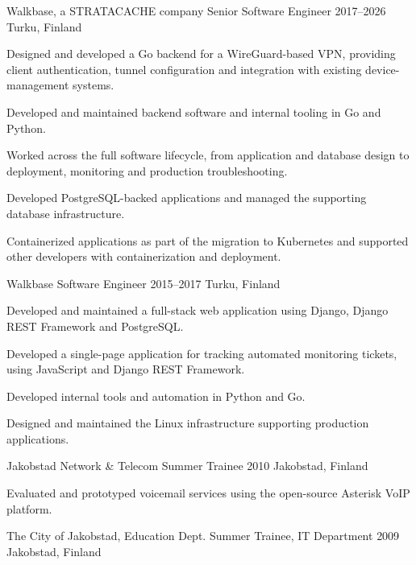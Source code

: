 \cventry
    {Walkbase, a STRATACACHE company}
    {Senior Software Engineer}
    {2017--2026}
    {Turku, Finland}

\begin{cvitems}
    \item Designed and developed a Go backend for a WireGuard-based VPN, providing client authentication, tunnel configuration and integration with existing device-management systems.
    \item Developed and maintained backend software and internal tooling in Go and Python.
    \item Worked across the full software lifecycle, from application and database design to deployment, monitoring and production troubleshooting.
    \item Developed PostgreSQL-backed applications and managed the supporting database infrastructure.
    \item Containerized applications as part of the migration to Kubernetes and supported other developers with containerization and deployment.
\end{cvitems}

\vspace{0.5em}

\cventry
    {Walkbase}
    {Software Engineer}
    {2015--2017}
    {Turku, Finland}

\begin{cvitems}
    \item Developed and maintained a full-stack web application using Django, Django REST Framework and PostgreSQL.
    \item Developed a single-page application for tracking automated monitoring tickets, using JavaScript and Django REST Framework.
    \item Developed internal tools and automation in Python and Go.
    \item Designed and maintained the Linux infrastructure supporting production applications.
\end{cvitems}

\vspace{0.5em}

\cventry
    {Jakobstad Network \& Telecom}
    {Summer Trainee}
    {2010}
    {Jakobstad, Finland}

\begin{cvitems}
    \item Evaluated and prototyped voicemail services using the open-source Asterisk VoIP platform.
\end{cvitems}

\vspace{0.5em}

\cventry
    {The City of Jakobstad, Education Dept.}
    {Summer Trainee, IT Department}
    {2009}
    {Jakobstad, Finland}
